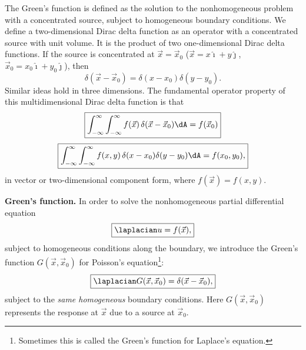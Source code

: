 The Green's function is defined as the solution to the nonhomogeneous problem with a concentrated source, subject to homogeneous boundary conditions.  We define a two-dimensional Dirac delta function as an operator with a concentrated source with unit volume.  It is the product of two one-dimensional Dirac delta functions.  If the source is concentrated at $\vec{x} = \vec{x}_0$ ($\vec{x} = x\hat{\imath}+y\hat{\jmath}$, $\vec{x}_0 = x_0\hat{\imath}+y_0\hat{\jmath}$), then
\begin{equation}
\label{eq:9.5.2}
\boxed{\delta(\vec{x}-\vec{x}_0) = \delta(x-x_0)\delta(y-y_0).}
\end{equation}
Similar ideas hold in three dimensions.  The fundamental operator property of this multidimensional Dirac delta function is that
\begin{equation}
\label{eq:9.5.3}
\boxed{\int_{-\infty}^{\infty}\int_{-\infty}^{\infty} f(\vec{x})\,\delta(\vec{x}-\vec{x}_0)\dA = f(\vec{x}_0)}
\end{equation}
\begin{equation}
\label{eq:9.5.4}
\boxed{\int_{-\infty}^{\infty}\int_{-\infty}^{\infty} f(x,y)\,\delta(x-x_0)\delta(y-y_0)\dA = f(x_0,y_0),}
\end{equation}
in vector or two-dimensional component form, where $f(\vec{x}) = f(x,y)$.

\textbf{Green's function.}
In order to solve the nonhomogeneous partial differential equation
\begin{equation}
\label{eq:9.5.5}
\boxed{\laplacian u = f(\vec{x}),}
\end{equation}
subject to homogeneous conditions along the boundary, we introduce the Green's function $G(\vec{x},\vec{x}_0)$ for Poisson's equation\footnote{Sometimes this is called the Green's function for Laplace's equation.}:
\begin{equation}
\label{eq:9.5.6}
\boxed{\laplacian G(\vec{x},\vec{x}_0) = \delta(\vec{x}-\vec{x}_0),}
\end{equation}
subject to the \emph{same homogeneous} boundary conditions.  Here $G(\vec{x},\vec{x}_0)$ represents the response at $\vec{x}$ due to a source at $\vec{x}_0$.

